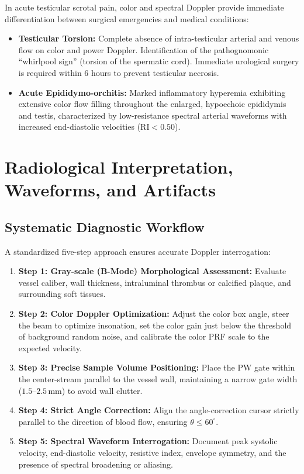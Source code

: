 \documentclass[11pt,a4paper]{article}
\begin{document}
In acute testicular scrotal pain, color and spectral Doppler provide immediate differentiation between surgical emergencies and medical conditions:
\begin{itemize}[leftmargin=*]
    \item \textbf{Testicular Torsion:} Complete absence of intra-testicular arterial and venous flow on color and power Doppler. Identification of the pathognomonic ``whirlpool sign'' (torsion of the spermatic cord). Immediate urological surgery is required within 6 hours to prevent testicular necrosis.
    \item \textbf{Acute Epididymo-orchitis:} Marked inflammatory hyperemia exhibiting extensive color flow filling throughout the enlarged, hypoechoic epididymis and testis, characterized by low-resistance spectral arterial waveforms with increased end-diastolic velocities ($\text{RI} < 0.50$).
\end{itemize}

\section{Radiological Interpretation, Waveforms, and Artifacts}

\subsection{Systematic Diagnostic Workflow}

A standardized five-step approach ensures accurate Doppler interrogation:
\begin{enumerate}[leftmargin=*]
    \item \textbf{Step 1: Gray-scale (B-Mode) Morphological Assessment:} Evaluate vessel caliber, wall thickness, intraluminal thrombus or calcified plaque, and surrounding soft tissues.
    \item \textbf{Step 2: Color Doppler Optimization:} Adjust the color box angle, steer the beam to optimize insonation, set the color gain just below the threshold of background random noise, and calibrate the color PRF scale to the expected velocity.
    \item \textbf{Step 3: Precise Sample Volume Positioning:} Place the PW gate within the center-stream parallel to the vessel wall, maintaining a narrow gate width ($1.5\text{--}2.5\,\text{mm}$) to avoid wall clutter.
    \item \textbf{Step 4: Strict Angle Correction:} Align the angle-correction cursor strictly parallel to the direction of blood flow, ensuring $\theta \le 60^\circ$.
    \item \textbf{Step 5: Spectral Waveform Interrogation:} Document peak systolic velocity, end-diastolic velocity, resistive index, envelope symmetry, and the presence of spectral broadening or aliasing.
\end{enumerate}
\end{document}

